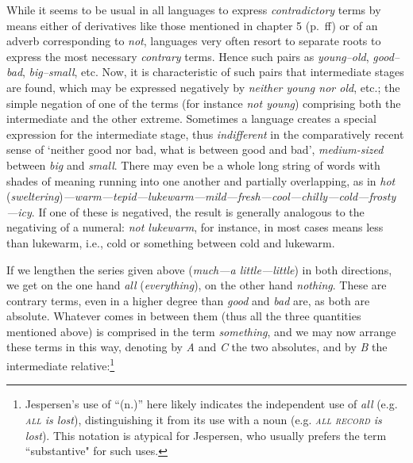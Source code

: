 While it seems to be usual in all languages to express \textit{contradictory} terms by means either of derivatives like those mentioned in chapter 5 (p.~\pageref{ch:5}ff) or of an adverb corresponding to \textit{not}, languages very often resort to separate roots to express the most necessary \textit{contrary} terms. Hence such pairs as \textit{young--old}, \textit{good--bad}, \textit{big--small}, etc. Now, it is characteristic of such pairs that intermediate stages are found, which may be expressed negatively by \textit{neither young nor old}, etc.; the simple negation of one of the terms (for instance \textit{not young}) comprising both the intermediate and the other extreme. Sometimes a language creates a special expression for the intermediate stage, thus \textit{indifferent} in the comparatively recent sense of `neither good nor bad, what is between good and bad', \textit{medium-sized} between \textit{big} and \textit{small}. There may even be a whole long string of words with shades of meaning running into one another and partially overlapping, as in \textit{hot} (\textit{sweltering})\textit{---warm---tepid---lukewarm---mild---fresh---cool---chilly---cold---frosty---icy}. If one of these is negatived, the result is generally analogous to the negativing of a numeral: \textit{not lukewarm}, for instance, in most cases means less than lukewarm, i.e., cold or something between cold and lukewarm.

If we lengthen the series given above (\textit{much---a little---little}) in both directions, we get on the one hand \textit{all} (\textit{everything}), on the other hand \textit{nothing}. These are contrary terms, even in a higher degree than \textit{good} and \textit{bad} are, as both are absolute. Whatever comes in between them (thus all the three quantities mentioned above) is comprised in the term \textit{something}, and we may now arrange these terms in this way, denoting by \textit{A} and \textit{C} the two absolutes, and by \textit{B} the intermediate relative:\footnote{Jespersen's use of ``(n.)'' here likely indicates the independent use of \textit{all} (e.g. \textit{\textsc{all} is lost}), distinguishing it from its use with a noun (e.g. \textit{\textsc{all record} is lost}). This notation is atypical for Jespersen, who usually prefers the term ``substantive" for such uses. \eds}


